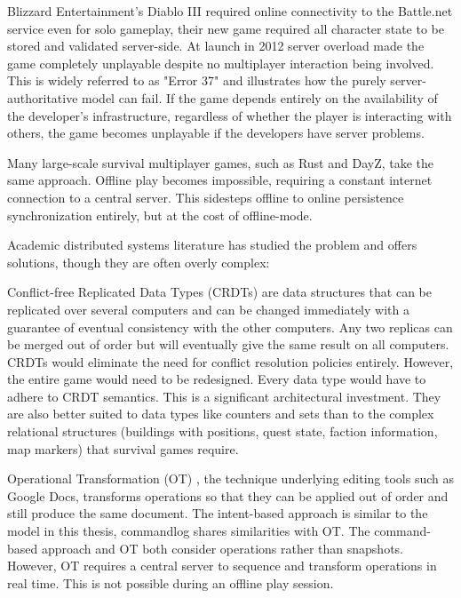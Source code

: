 \documentclass{article}
\begin{document}
Blizzard Entertainment's Diablo III \autocite{diablo3} required online connectivity to the Battle.net service even for solo gameplay, their new game required all character state to be stored and validated server-side. At launch in 2012 server overload made the game completely unplayable despite no multiplayer interaction being involved. This is widely referred to as "Error 37" and illustrates how the purely server-authoritative model can fail. If the game depends entirely on the availability of the developer's infrastructure, regardless of whether the player is interacting with others, the game becomes unplayable if the developers have server problems.

Many large-scale survival multiplayer games, such as Rust and DayZ, take the same approach. Offline play becomes impossible, requiring a constant internet connection to a central server. This sidesteps offline to online persistence synchronization entirely, but at the cost of offline-mode.

Academic distributed systems literature has studied the problem and offers solutions, though they are often overly complex:

Conflict-free Replicated Data Types (CRDTs) \autocite{shapiro2011crdts} are data structures that can be replicated over several computers and can be changed immediately with a guarantee of eventual consistency with the other computers. Any two replicas can be merged out of order but will eventually give the same result on all computers. CRDTs would eliminate the need for conflict resolution policies entirely. However, the entire game would need to be redesigned. Every data type would have to adhere to CRDT semantics. This is a significant architectural investment. They are also better suited to data types like counters and sets than to the complex relational structures (buildings with positions, quest state, faction information, map markers) that survival games require.

Operational Transformation (OT) \autocite{ellis1989ot}, the technique underlying editing tools such as Google Docs, transforms operations so that they can be applied out of order and still produce the same document. The intent-based approach is similar to the model in this thesis, commandlog shares similarities with OT. The command-based approach and OT both consider operations rather than snapshots. However, OT requires a central server to sequence and transform operations in real time. This is not possible during an offline play session.
\end{document}
